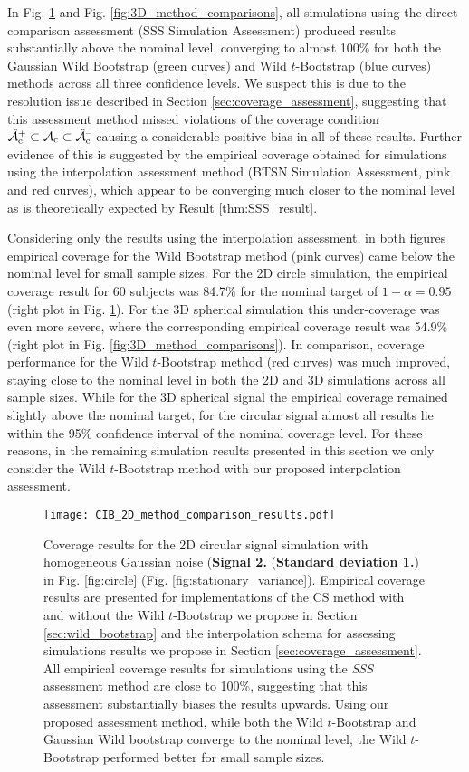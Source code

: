 In Fig. \ref{fig:2D_method_comparisons} and Fig. \ref{fig:3D_method_comparisons}, all simulations using the direct comparison assessment (SSS Simulation Assessment) produced results substantially above the nominal level, converging to almost 100\% for both the Gaussian Wild Bootstrap (green curves) and Wild $t$-Bootstrap (blue curves) methods across all three confidence levels. We suspect this is due to the resolution issue described in Section \ref{sec:coverage_assessment}, suggesting that this assessment method missed violations of the coverage condition $\operatorname{\hat{\mathcal{A}}_{c}^+} \subset \operatorname{\mathcal{A}_{c}} \subset \operatorname{\hat{\mathcal{A}}_{c}^{\textrm{--}}}$ causing a considerable positive bias in all of these results. Further evidence of this is suggested by the empirical coverage obtained for simulations using the interpolation assessment method (BTSN Simulation Assessment, pink and red curves), which appear to be converging much closer to the nominal level as is theoretically expected by Result \ref{thm:SSS_result}.

Considering only the results using the interpolation assessment, in both figures empirical coverage for the Wild Bootstrap method (pink curves) came below the nominal level for small sample sizes. For the 2D circle simulation, the empirical coverage result for 60 subjects was 84.7\% for the nominal target of $1 - \alpha = 0.95$ (right plot in Fig. \ref{fig:2D_method_comparisons}). For the 3D spherical simulation this under-coverage was even more severe, where the corresponding empirical coverage result was 54.9\% (right plot in Fig. \ref{fig:3D_method_comparisons}). In comparison, coverage performance for the Wild $t$-Bootstrap method (red curves) was much improved, staying close to the nominal level in both the 2D and 3D simulations across all sample sizes. While for the 3D spherical signal the empirical coverage remained slightly above the nominal target, for the circular signal almost all results lie within the 95\% confidence interval of the nominal coverage level. For these reasons, in the remaining simulation results presented in this section we only consider the Wild $t$-Bootstrap method with our proposed interpolation assessment.  

\begin{figure}[htbp]
\hspace*{-1.5cm}
    \texttt{[image: CIB\_2D\_method\_comparison\_results.pdf]}
\caption{Coverage results for the 2D circular signal simulation with homogeneous Gaussian noise (\textbf{Signal 2.} (\textbf{Standard deviation 1.}) in Fig. \ref{fig:circle} (Fig. \ref{fig:stationary_variance}). Empirical coverage results are presented for implementations of the CS method with and without the Wild $t$-Bootstrap we propose in Section \ref{sec:wild_bootstrap} and the interpolation schema for assessing simulations results we propose in Section \ref{sec:coverage_assessment}. All empirical coverage results for simulations using the \textit{SSS} assessment method are close to 100\%, suggesting that this assessment substantially biases the results upwards. Using our proposed assessment method, while both the Wild $t$-Bootstrap and Gaussian Wild bootstrap converge to the nominal level, the Wild $t$-Bootstrap performed better for small sample sizes.}
\label{fig:2D_method_comparisons}
\end{figure}

